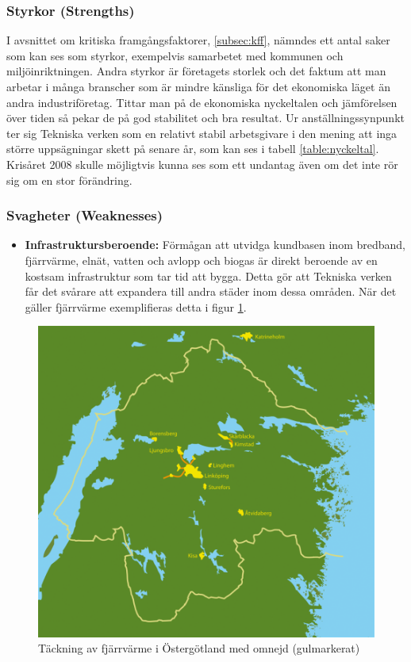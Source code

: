 \documentclass[10pt,a4paper]{article}
\begin{document}
\subsubsection{Styrkor (Strengths)}
I avsnittet om kritiska framgångsfaktorer, \ref{subsec:kff}, nämndes ett antal
saker som kan ses som styrkor, exempelvis samarbetet med kommunen och
miljöinriktningen. Andra styrkor är företagets storlek och det
faktum att man arbetar i många branscher som är mindre känsliga för det
ekonomiska läget än andra industriföretag. Tittar man på de ekonomiska
nyckeltalen och jämförelsen över tiden så pekar de på god stabilitet och bra
resultat. Ur anställningssynpunkt ter sig Tekniska verken som en relativt 
stabil arbetsgivare i den mening att inga större uppsägningar skett på senare
år, som kan ses i tabell \ref{table:nyckeltal}. Krisåret 2008 skulle möjligtvis
kunna ses som ett undantag även om det inte rör sig om en stor förändring.

\subsubsection{Svagheter (Weaknesses)}
\begin{itemize}
	\item \textbf{Infrastruktursberoende:}
		Förmågan att utvidga kundbasen inom bredband, fjärrvärme, elnät, vatten och avlopp och biogas är direkt beroende av en kostsam infrastruktur som tar tid att bygga. Detta gör att Tekniska verken får det svårare att expandera till andra städer inom dessa områden. När det gäller fjärrvärme exemplifieras detta i figur \ref{fig:fjarr}.
		
\end{itemize}
\begin{figure}[H] 
\centerline{\includegraphics[scale=0.5]{Bilder/teckning_fjarrvarme.png}}
\caption{Täckning av fjärrvärme i Östergötland med omnejd (gulmarkerat)}
\label{fig:fjarr}
\end{figure}  
\end{document}
